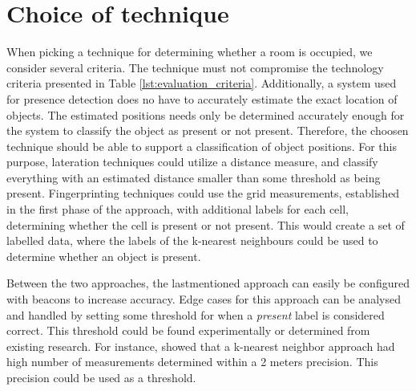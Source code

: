 \section{Choice of technique}
When picking a technique for determining whether a room is occupied, we consider several criteria.
The technique must not compromise the technology criteria presented in Table \ref{lst:evaluation_criteria}.
Additionally, a system used for presence detection does no have to accurately estimate the exact location of objects.
The estimated positions needs only be determined accurately enough for the system to classify the object as present or not present.
Therefore, the choosen technique should be able to support a classification of object positions.  
For this purpose, lateration techniques could utilize a distance measure, and classify everything with an estimated distance smaller than some threshold as being present.
Fingerprinting techniques could use the grid measurements, established in the first phase of the approach, with additional labels for each cell, determining whether the cell is present or not present.
This would create a set of labelled data, where the labels of the k-nearest neighbours could be used to determine whether an object is present. 

Between the two approaches, the lastmentioned approach can easily be configured with beacons to increase accuracy.
Edge cases for this approach can be analysed and handled by setting some threshold for when a \textit{present} label is considered correct. This threshold could be found experimentally or determined from existing research. 
For instance, \citeauthor{ble_kneares_neural}\cite{ble_kneares_neural} showed that a k-nearest neighbor approach had high number of measurements determined within a 2 meters precision. 
This precision could be used as a threshold.    


